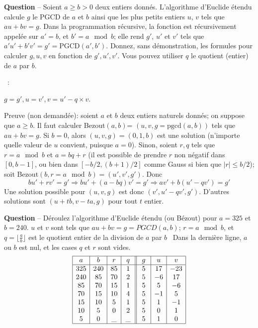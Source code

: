 \documentclass[12pt]{article}
\newcounter{QNumber}
\newcommand{\Question}[2][ ]{
 \stepcounter{QNumber}
  \noindent\textbf{Question \theQNumber} --
  #2~#1}
\begin{document}
\Question{Soient $a \ge b > 0$ deux entiers donnés. L'algorithme d'Euclide étendu 
calcule $g$ le PGCD de $a$ et $b$ ainsi que les plus petits entiers $u$, $v$ tels que $au+bv=g$. Dans la programmation récursive, la fonction est récursivement appelée sur $a'=b$, et $b'=a \mod b$; elle rend $g'$, $u'$ et $v'$ tels que
$a'u'+b'v'=g'=\mbox{PGCD}(a',b')$. Donnez, sans démonstration,  les formules
pour calculer  $g, u, v$ en fonction de $g', u', v'$. Vous pouvez utiliser $q$ le quotient (entier) de $a$ par $b$.}

~:

$g=g', u=v', v=u'-q\times v$. 

Preuve (non demandée): soient  $a$ et $b$ 
deux entiers naturels  donnés;  on suppose que $a\ge b$.  Il faut calculer
Bezout$(a,b)$= $(u,v,g=\mbox{pgcd}(a,b))$ tels que $au+bv=g$.
Si $b=0$, alors $(u, v, g)=(0, 1, b)$ est une solution (n'importe quelle valeur de $u$ convient, puisque $a=0$). Sinon, soient $r, q$ tels que $r=a \mod b$ et $a=bq+r$ (il est possible de prendre $r$ non négatif dans $[0, b-1]$,
ou bien dans $[- b/2, (b+1)/2]$ comme Gauss si bien que $|r| \le b/2$); soit Bezout$(b, r= a \mod b)=(u',v',g')$.
Donc 
$$bu' + rv'=g'\Rightarrow b u' + (a-bq) v' = g' \Rightarrow av' + b(u'-qv')=g'$$
Une solution possible pour $(u,v,g)$ est donc $(v', u'-qv', g')$.
D'autres solutions sont $(u+tb,v-ta,g)$ pour tout $t$ entier.

\Question{D\'eroulez l'algorithme d'Euclide \'etendu (ou Bézout) pour $a=325$ et $b=240$.
$u$ et $v$ sont tels que $au+bv=g=PGCD(a,b)$; $r=a \mod b$, et $q=\lfloor \frac{a}{b}\rfloor$
est le quotient entier de la division de $a$ par $b$}
Dans la dernière ligne, $a$ ou $b$ est nul, et les cases $q$ et $r$ sont vides.
$$
\begin{array}{|c|c|c|c||c|c|c|}
\hline
\; a\; & \; b\; & \; r\; & \; q\; & \; g\; & \; u\; & \; v\; \\
\hline
325 & 240 & 85 &  1  &  5 &  17 & -23 \\
240 & 85  & 70 &  2  &  5 &  -6 & 17 \\
85  & 70  & 15 &  1  &  5 &  5 & -6  \\
70  & 15  & 10 &  4  &  5 &  -1 & 5 \\
15  & 10  & 5  &  1  &  5 &  1 & -1 \\
10  & 5   & 0  &  2  &  5 &  0 & 1 \\
5   & 0   & \_  &  \_  &  5  &  1 & 0 \\
\hline
\end{array}$$
\end{document}
